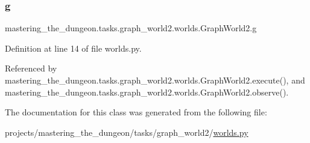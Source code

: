 \subsubsection{\texorpdfstring{g}{g}}
{\footnotesize\ttfamily mastering\+\_\+the\+\_\+dungeon.\+tasks.\+graph\+\_\+world2.\+worlds.\+Graph\+World2.\+g}



Definition at line 14 of file worlds.\+py.



Referenced by mastering\+\_\+the\+\_\+dungeon.\+tasks.\+graph\+\_\+world2.\+worlds.\+Graph\+World2.\+execute(), and mastering\+\_\+the\+\_\+dungeon.\+tasks.\+graph\+\_\+world2.\+worlds.\+Graph\+World2.\+observe().



The documentation for this class was generated from the following file\+:\begin{DoxyCompactItemize}
\item 
projects/mastering\+\_\+the\+\_\+dungeon/tasks/graph\+\_\+world2/\hyperlink{projects_2mastering__the__dungeon_2tasks_2graph__world2_2worlds_8py}{worlds.\+py}\end{DoxyCompactItemize}
